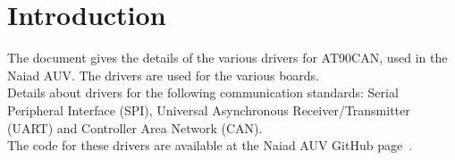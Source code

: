 
\section{Introduction}\label{sec:introduction}
The document gives the details of the various drivers for AT90CAN, used in the Naiad AUV. The drivers are used for the various boards. \\
Details about drivers for the following communication standards: Serial Peripheral Interface (SPI), Universal Asynchronous Receiver/Transmitter (UART) and Controller Area Network (CAN). \\
The code for these drivers are available at the Naiad AUV GitHub page~\cite{web:github_naiad-auv-software}.
